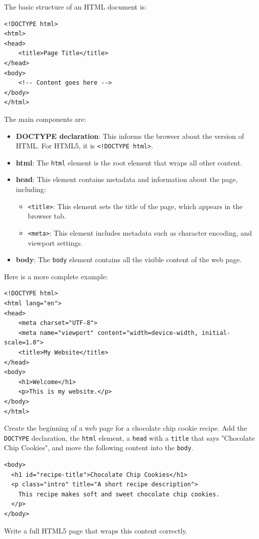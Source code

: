 The basic structure of an HTML document is:

\begin{verbatim}
<!DOCTYPE html>
<html>
<head>
    <title>Page Title</title>
</head>
<body>
    <!-- Content goes here -->
</body>
</html>
\end{verbatim}

The main components are:
\begin{itemize}
    \item \textbf{DOCTYPE declaration}: This informs the browser about the version of HTML. For HTML5, it is \verb|<!DOCTYPE html>|.
    \item \textbf{html}: The \verb|html| element is the root element that wraps all other content.
    \item \textbf{head}: This element contains metadata and information about the page, including:
    \begin{itemize}
        \item \verb|<title>|: This element sets the title of the page, which appears in the browser tab.
        \item \verb|<meta>|: This element includes metadata such as character encoding, and viewport settings.
    \end{itemize}
    \item \textbf{body}: The \verb|body| element contains all the visible content of the web page.
\end{itemize}

Here is a more complete example:

\begin{verbatim}
<!DOCTYPE html>
<html lang="en">
<head>
    <meta charset="UTF-8">
    <meta name="viewport" content="width=device-width, initial-scale=1.0">
    <title>My Website</title>
</head>
<body>
    <h1>Welcome</h1>
    <p>This is my website.</p>
</body>
</html>
\end{verbatim}

\begin{Exercise}[label=html-structure1, title=Building a Full HTML Document]
Create the beginning of a web page for a chocolate chip cookie recipe. 
Add the \texttt{DOCTYPE} declaration, the \texttt{html} element, 
a \texttt{head} with a \texttt{title} that says "Chocolate Chip Cookies", 
and move the following content into the \texttt{body}.

\begin{verbatim}
<body>
  <h1 id="recipe-title">Chocolate Chip Cookies</h1>
  <p class="intro" title="A short recipe description">
    This recipe makes soft and sweet chocolate chip cookies.
  </p>
</body>
\end{verbatim}

Write a full HTML5 page that wraps this content correctly.
\end{Exercise}

